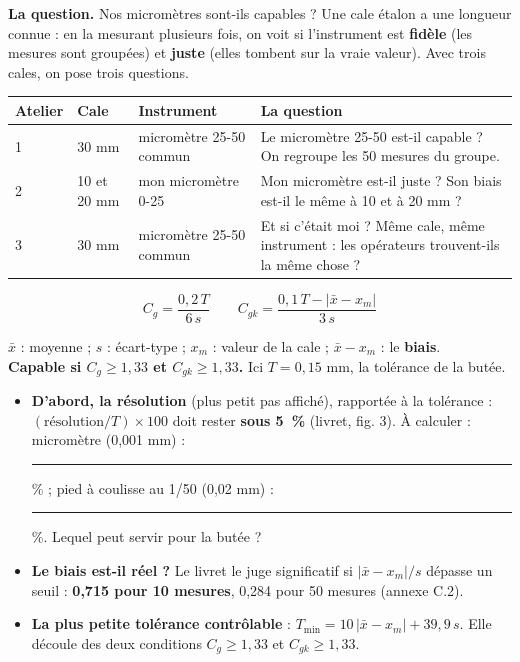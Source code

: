 \documentclass[10pt,a4paper]{article}
\begin{document}
\thispagestyle{fancy}

\begin{tcolorbox}[boite]
\textbf{La question.} Nos micromètres sont-ils capables ? Une cale étalon a une longueur connue : en la mesurant plusieurs fois, on voit si l'instrument est \textbf{fidèle} (les mesures sont groupées) et \textbf{juste} (elles tombent sur la vraie valeur). Avec trois cales, on pose trois questions.
\end{tcolorbox}

\renewcommand{\arraystretch}{1.3}
\begin{tabularx}{\linewidth}{@{}l l l X@{}}
\toprule
\textbf{Atelier} & \textbf{Cale} & \textbf{Instrument} & \textbf{La question}\\\midrule
1 & 30 mm & micromètre 25-50 commun & Le micromètre 25-50 est-il capable ? On regroupe les 50 mesures du groupe.\\
2 & 10 et 20 mm & mon micromètre 0-25 & Mon micromètre est-il juste ? Son biais est-il le même à 10 et à 20 mm ?\\
3 & 30 mm & micromètre 25-50 commun & Et si c'était moi ? Même cale, même instrument : les opérateurs trouvent-ils la même chose ?\\
\bottomrule
\end{tabularx}

\begin{minipage}[c]{0.50\linewidth}
\[C_g=\frac{0{,}2\,T}{6\,s}\qquad C_{gk}=\frac{0{,}1\,T-\lvert\bar x-x_m\rvert}{3\,s}\]
\end{minipage}\hfill
\begin{minipage}[c]{0.47\linewidth}\small
$\bar x$ : moyenne ; $s$ : écart-type ; $x_m$ : valeur de la cale ; $\bar x - x_m$ : le \textbf{biais}.\\
\textbf{Capable si $C_g \ge 1{,}33$ et $C_{gk} \ge 1{,}33$.} Ici $T = 0{,}15$ mm, la tolérance de la butée.
\end{minipage}

\vspace{3pt}
\begin{itemize}
\item \textbf{D'abord, la résolution} (plus petit pas affiché), rapportée à la tolérance : $(\text{résolution} / T) \times 100$ doit rester \textbf{sous 5~\%} (livret, fig. 3). À calculer : micromètre (0,001 mm) : \rule{12mm}{0.3pt} \% ; pied à coulisse au 1/50 (0,02 mm) : \rule{12mm}{0.3pt} \%. Lequel peut servir pour la butée ?
\item \textbf{Le biais est-il réel ?} Le livret le juge significatif si $\lvert\bar x-x_m\rvert / s$ dépasse un seuil : \textbf{0,715 pour 10 mesures}, 0,284 pour 50 mesures (annexe C.2).
\item \textbf{La plus petite tolérance contrôlable} : $T_{\min} = 10\,\lvert\bar x - x_m\rvert + 39{,}9\,s$. Elle découle des deux conditions $C_g \ge 1{,}33$ et $C_{gk} \ge 1{,}33$.
\end{itemize}
\end{document}
